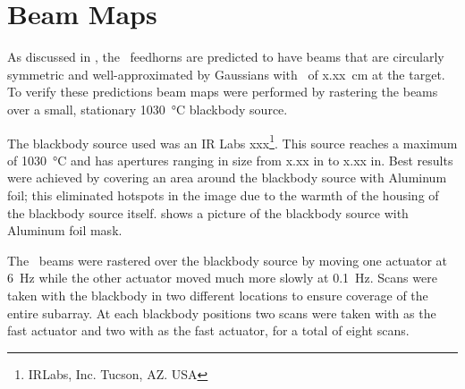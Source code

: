 \section{Beam Maps} \label{sec:ch8-beam-maps}

As discussed in , the \Imager\ feedhorns are predicted to have beams that are circularly symmetric and well-approximated by Gaussians with \FWHM\ of x.xx~cm at the target.
To verify these predictions beam maps were performed by rastering the beams over a small, stationary \SI{1030}{\celsius} blackbody source.

The blackbody source used was an IR Labs xxx\footnote{IRLabs, Inc. Tucson, AZ. USA}.
This source reaches a maximum of \SI{1030}{\celsius} and has apertures ranging in size from x.xx in to x.xx in.
Best results were achieved by covering an area around the blackbody source with Aluminum foil; this eliminated hotspots in the image due to the warmth of the housing of the blackbody source itself.
 shows a picture of the blackbody source with Aluminum foil mask.

The \Imager\ beams were rastered over the blackbody source by moving one actuator at \SI{6}{\hertz} while the other actuator moved much more slowly at \SI{0.1}{\hertz}.
Scans were taken with the blackbody in two different locations to ensure coverage of the entire subarray.
At each blackbody positions two scans were taken with  as the fast actuator and two with  as the fast actuator, for a total of eight scans.

